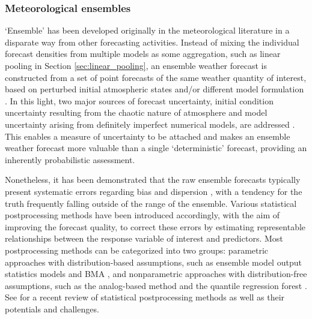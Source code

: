 \documentclass[11pt]{article}
\begin{document}
\subsubsection{Meteorological ensembles}
\label{sec:meteorological_ensembles}

`Ensemble' has been developed originally in the meteorological literature in a disparate way from other forecasting activities. Instead of mixing the individual forecast densities from multiple models as some aggregation, such as linear pooling in Section \ref{sec:linear_pooling}, an ensemble weather forecast is constructed from a set of point forecasts of the same weather quantity of interest, based on perturbed initial atmospheric states \citep[e.g.,][]{Maqsood2004-pe,Gneiting2005-yn} and/or different model formulation \citep[e.g.,][]{Buizza1999-st,Buizza2005-wf}. In this light, two major sources of forecast uncertainty, initial condition uncertainty resulting from the chaotic nature of atmosphere and model uncertainty arising from definitely imperfect numerical models, are addressed \citep{Lorenz1963-yn,Weigel2008-vy,Baran2014-tm}. This enables a measure of uncertainty to be attached and makes an ensemble weather forecast more valuable than a single `deterministic' forecast, providing an inherently probabilistic assessment.

Nonetheless, it has been demonstrated that the raw ensemble forecasts typically present systematic errors regarding bias \citep{Atger2003-lx,Mass2003-bc} and dispersion \citep{Buizza2005-wf,Sloughter2010-ae}, with a tendency for the truth frequently falling outside of the range of the ensemble. Various statistical postprocessing methods have been introduced accordingly, with the aim of improving the forecast quality, to correct these errors by estimating representable relationships between the response variable of interest and predictors. Most postprocessing methods can be categorized into two groups: parametric approaches with distribution-based assumptions, such as ensemble model output statistics \citep[EMOS,][]{Gneiting2005-ua} models and BMA \citep{Raftery2005-xi}, and nonparametric approaches with distribution-free assumptions, such as the analog-based method \citep[e.g.,][]{Delle_Monache2013-os} and the quantile regression forest \citep{Taillardat2019-ni}. See \cite{Vannitsem2021-bg} for a recent review of statistical postprocessing methods as well as their potentials and challenges.
\end{document}
